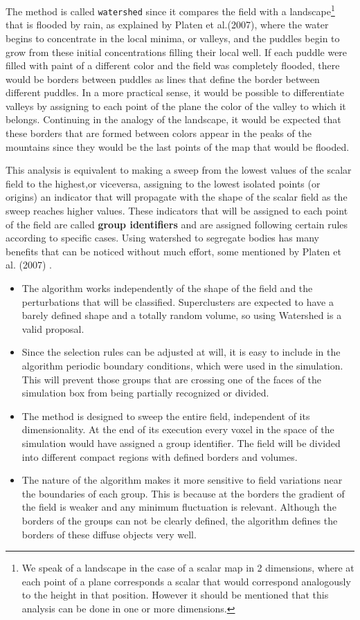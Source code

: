 \documentclass[a4paper,fleqn,usenatbib]{mnras}
\begin{document}
The method is called \texttt{watershed} since it compares the field with a landscape\footnote{We speak of a landscape in the case of a scalar map in 2 dimensions, where at each point of a plane corresponds a scalar that would correspond analogously to the height in that position. However it should be mentioned that this analysis can be done in one or more dimensions.} that is flooded by rain, as explained by Platen et al.(2007)\cite{CosmicWatershedVoidDetection}, where the water begins to concentrate in the local minima, or valleys, and the puddles begin to grow from these initial concentrations filling their local well. If each puddle were filled with paint of a different color and the field was completely flooded, there would be borders between puddles as lines that define the border between different puddles. In a more practical sense, it would be possible to differentiate valleys by assigning to each point of the plane the color of the valley to which it belongs. Continuing in the analogy of the landscape, it would be expected that these borders that are formed between colors appear in the peaks of the mountains since they would be the last points of the map that would be flooded.

This analysis is equivalent to making a sweep from the lowest values of the scalar field to the highest,or viceversa, assigning to the lowest isolated points (or origins) an indicator that will propagate with the shape of the scalar field as the sweep reaches higher values. These indicators that will be assigned to each point of the field are called \textbf{group identifiers} and are assigned following certain rules according to specific cases.
Using watershed to segregate bodies has many benefits that can be noticed without much effort, some mentioned by Platen et al. (2007) \cite{CosmicWatershedVoidDetection}.
\begin{itemize}
\item The algorithm works independently of the shape of the field and the perturbations that will be classified. Superclusters are expected to have a barely defined shape and a totally random volume, so using Watershed is a valid proposal.
\item Since the selection rules can be adjusted at will, it is easy to include in the algorithm periodic boundary conditions, which were used in the simulation. This will prevent those groups that are crossing one of the faces of the simulation box from being partially recognized or divided.
\item The method is designed to sweep the entire field, independent of its dimensionality. At the end of its execution every voxel in the space of the simulation would have assigned a group identifier. The field will be divided into different compact regions with defined borders and volumes.
\item The nature of the algorithm makes it more sensitive to field variations near the boundaries of each group. This is because at the borders the gradient of the field is weaker and any minimum fluctuation is relevant. Although the borders of the groups can not be clearly defined, the algorithm defines the borders of these diffuse objects very well.
\end{itemize}
\end{document}
